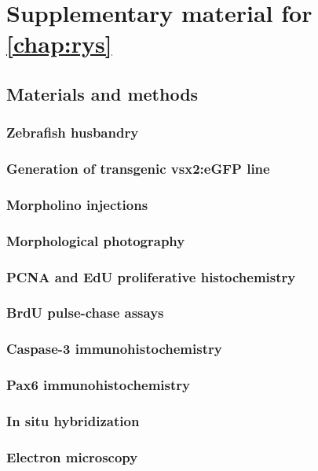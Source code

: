 \chapter{Supplementary material for \autoref{chap:rys}}
\section{Materials and methods}
\subsection{Zebrafish husbandry}

\subsection{Generation of transgenic vsx2:eGFP line}

\subsection{Morpholino injections}
 
\subsection{Morphological photography}

\subsection{PCNA and EdU proliferative histochemistry}

\subsection{BrdU pulse-chase assays}

\subsection{Caspase-3 immunohistochemistry}

\subsection{Pax6 immunohistochemistry}

\subsection{In situ hybridization}

\subsection{Electron microscopy}

